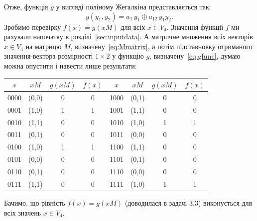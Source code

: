 Отже, функція $g$ у вигляді поліному Жегалкіна представляється так:
\begin{equation}
    \label{eq:gfunc}
    g(y_1, y_2) = a_1\, y_1 \oplus a_{12}\, y_1 y_2.
\end{equation}
Зробимо перевірку $f(x) = g(xM)$ для всіх $x \in V_{4}$. Значення функції $f$ ми рахували напочатку в розділі~\ref{sec:inputdata}. 
А матричне множення всіх векторів $x \in V_{4}$ на матрицю $M$, визначену~\eqref{eq:Mmatrix}, а потім підставновку отриманого 
значення-вектора розмірності $1\times 2$ у функцію $g$, визначену~\eqref{eq:gfunc}, думаю можна опустити і навести 
лише результати:
\begin{center}
    \renewcommand{\arraystretch}{1.1}
    \begin{tabular}{c|c|c|c||c|c|c|c}
        $x$  & $xM$  & $g(xM)$ & $f(x)$ & $x$  & $xM$  & $g(xM)$ & $f(x)$ \\
        \hline
        0000 & (0,0) & 0       & 0      & 1000 & (0,1) & 0       & 0      \\
        0001 & (1,0) & 1       & 1      & 1001 & (1,1) & 0       & 0      \\
        0010 & (1,1) & 0       & 0      & 1010 & (1,0) & 1       & 1      \\
        0011 & (0,1) & 0       & 0      & 1011 & (0,0) & 0       & 0      \\
        0100 & (1,0) & 1       & 1      & 1100 & (1,1) & 0       & 0      \\
        0101 & (0,0) & 0       & 0      & 1101 & (0,1) & 0       & 0      \\
        0110 & (0,1) & 0       & 0      & 1110 & (0,0) & 0       & 0      \\
        0111 & (1,1) & 0       & 0      & 1111 & (1,0) & 1       & 1      \\
    \end{tabular}
\end{center}
Бачимо, що рівність $f(x) = g(xM)$ (доводилася в задачі 3.3) виконується для всіх значень $x \in V_{4}$.

